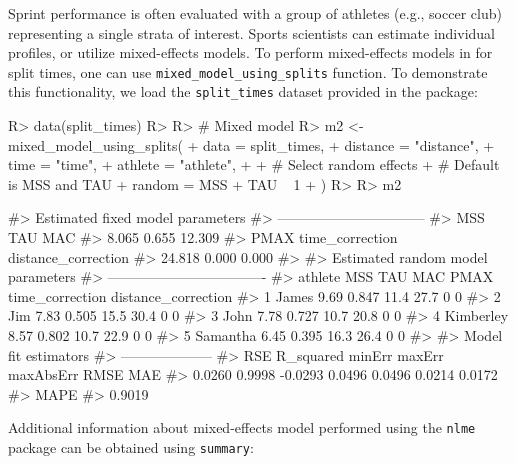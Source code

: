 \documentclass[
]{jss}
\begin{document}
Sprint performance is often evaluated with a group of athletes (e.g., soccer club) representing a single strata of interest. Sports scientists can estimate individual profiles, or utilize mixed-effects models. To perform mixed-effects models in  for split times, one can use \texttt{mixed\_model\_using\_splits} function. To demonstrate this functionality, we load the \texttt{split\_times} dataset provided in the  package:

\begin{CodeChunk}
\begin{CodeInput}
R> data(split_times)
R> 
R> # Mixed model
R> m2 <- mixed_model_using_splits(
+   data = split_times,
+   distance = "distance",
+   time = "time",
+   athlete = "athlete",
+ 
+   # Select random effects
+   # Default is MSS and TAU
+   random = MSS + TAU ~ 1
+ )
R> 
R> m2
\end{CodeInput}
\begin{CodeOutput}
#> Estimated fixed model parameters
#> --------------------------------
#>                 MSS                 TAU                 MAC 
#>               8.065               0.655              12.309 
#>                PMAX     time_correction distance_correction 
#>              24.818               0.000               0.000 
#> 
#> Estimated random model parameters
#> ----------------------------------
#>     athlete  MSS   TAU  MAC PMAX time_correction distance_correction
#> 1     James 9.69 0.847 11.4 27.7               0                   0
#> 2       Jim 7.83 0.505 15.5 30.4               0                   0
#> 3      John 7.78 0.727 10.7 20.8               0                   0
#> 4 Kimberley 8.57 0.802 10.7 22.9               0                   0
#> 5  Samantha 6.45 0.395 16.3 26.4               0                   0
#> 
#> Model fit estimators
#> --------------------
#>       RSE R_squared    minErr    maxErr maxAbsErr      RMSE       MAE 
#>    0.0260    0.9998   -0.0293    0.0496    0.0496    0.0214    0.0172 
#>      MAPE 
#>    0.9019
\end{CodeOutput}
\end{CodeChunk}

Additional information about mixed-effects model performed using the \texttt{nlme} package \citep{R-nlme} can be obtained using \texttt{summary}:
\end{document}
